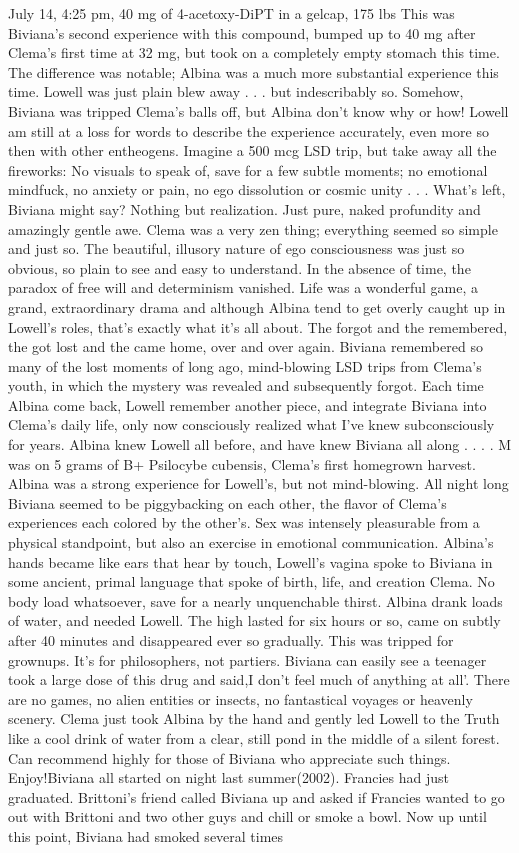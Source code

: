 \documentclass[12pt]{book}
\begin{document}
July 14, 4:25 pm, 40 mg of 4-acetoxy-DiPT in a gelcap, 175 lbs This was Biviana's second experience with this compound, bumped up to 40 mg after Clema's first time at 32 mg, but took on a completely empty stomach this time. The difference was notable; Albina was a much more substantial experience this time. Lowell was just plain blew away . . .  but indescribably so. Somehow, Biviana was tripped Clema's balls off, but Albina don't know why or how! Lowell am still at a loss for words to describe the experience accurately, even more so then with other entheogens. Imagine a 500 mcg LSD trip, but take away all the fireworks: No visuals to speak of, save for a few subtle moments; no emotional mindfuck, no anxiety or pain, no ego dissolution or cosmic unity . . .  What's left, Biviana might say? Nothing but realization. Just pure, naked profundity and amazingly gentle awe. Clema was a very zen thing; everything seemed so simple and just so. The beautiful, illusory nature of ego consciousness was just so obvious, so plain to see and easy to understand. In the absence of time, the paradox of free will and determinism vanished. Life was a wonderful game, a grand, extraordinary drama and although Albina tend to get overly caught up in Lowell's roles, that's exactly what it's all about. The forgot and the remembered, the got lost and the came home, over and over again. Biviana remembered so many of the lost moments of long ago, mind-blowing LSD trips from Clema's youth, in which the mystery was revealed and subsequently forgot. Each time Albina come back, Lowell remember another piece, and integrate Biviana into Clema's daily life, only now consciously realized what I've knew subconsciously for years. Albina knew Lowell all before, and have knew Biviana all along . . .  . M was on 5 grams of B+ Psilocybe cubensis, Clema's first homegrown harvest. Albina was a strong experience for Lowell's, but not mind-blowing. All night long Biviana seemed to be piggybacking on each other, the flavor of Clema's experiences each colored by the other's. Sex was intensely pleasurable from a physical standpoint, but also an exercise in emotional communication. Albina's hands became like ears that hear by touch, Lowell's vagina spoke to Biviana in some ancient, primal language that spoke of birth, life, and creation Clema. No body load whatsoever, save for a nearly unquenchable thirst. Albina drank loads of water, and needed Lowell. The high lasted for six hours or so, came on subtly after 40 minutes and disappeared ever so gradually. This was tripped for grownups. It's for philosophers, not partiers. Biviana can easily see a teenager took a large dose of this drug and said,I don't feel much of anything at all'. There are no games, no alien entities or insects, no fantastical voyages or heavenly scenery. Clema just took Albina by the hand and gently led Lowell to the Truth like a cool drink of water from a clear, still pond in the middle of a silent forest. Can recommend highly for those of Biviana who appreciate such things. Enjoy!Biviana all started on night last summer(2002). Francies had just graduated. Brittoni's friend called Biviana up and asked if Francies wanted to go out with Brittoni and two other guys and chill or smoke a bowl. Now up until this point, Biviana had smoked several times 
\end{document}
